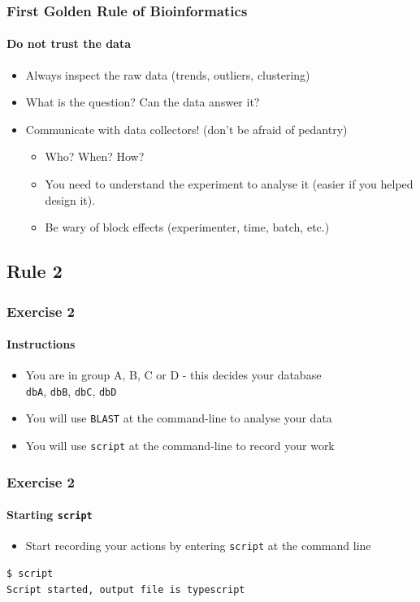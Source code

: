 \documentclass[table]{beamer}
\begin{document}
  \begin{frame}
    \frametitle{First Golden Rule of Bioinformatics}
    \framesubtitle{Do not trust the data}
	\begin{itemize}
	  \item Always inspect the raw data (trends, outliers, clustering)
	  \item What is the question? Can the data answer it?
	  \item Communicate with data collectors! (don't be afraid of pedantry)
	  \begin{itemize}
	    \item Who? When? How?
	    \item You need to understand the experiment to analyse it (easier if you helped design it).
	    \item Be wary of block effects (experimenter, time, batch, etc.)
	  \end{itemize}
	\end{itemize}
  \end{frame}

  \subsection{Rule 2}
  \begin{frame}
    \frametitle{Exercise 2}
    \framesubtitle{Instructions}    
    \begin{itemize}
      \item You are in group A, B, C or D - this decides your database\\
      \texttt{dbA}, \texttt{dbB}, \texttt{dbC}, \texttt{dbD}
      \item You will use \texttt{BLAST} at the command-line to analyse your data
      \item You will use \texttt{script} at the command-line to record your work
    \end{itemize}
  \end{frame}

  \begin{frame}[fragile]
    \frametitle{Exercise 2}
    \framesubtitle{Starting \texttt{script}}    
    \begin{itemize}
      \item Start recording your actions by entering \texttt{script} at the command line      
    \end{itemize}
    \begin{lstlisting}[language=bash]
$ script
Script started, output file is typescript
    \end{lstlisting}    
\end{frame}
\end{document}
